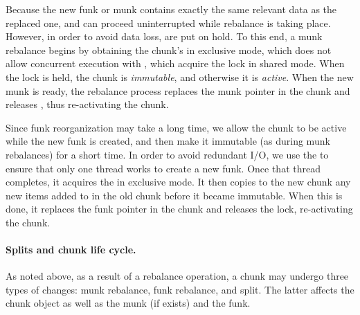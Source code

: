 Because the new funk or munk contains exactly the same relevant data as the replaced one, 
 and  can proceed uninterrupted while rebalance is taking place. 
However, in order to avoid data loss,  are put on hold. 
To this end, a munk rebalance begins by obtaining the chunk's  in exclusive mode,
which does not allow concurrent execution with  , which acquire the lock in shared mode.
When the lock is held, the chunk is \emph{immutable}, and otherwise it is \emph{active}. 
When the new munk is ready, the rebalance process replaces the munk pointer in the chunk and releases , thus 
re-activating the chunk.

Since funk reorganization may take a long time, we allow the chunk to be active while the new funk is created,
and then make it immutable (as during munk rebalances) for a short time. In order to avoid redundant I/O, 
we use the  to ensure that only one thread works to create a new funk.  Once that thread
completes, it acquires the  in exclusive mode.
It then copies to the new chunk any new items added to   in the old chunk before it became immutable. 
When this is done, it replaces the funk pointer in the chunk and releases the lock, re-activating the chunk.

\paragraph{Splits and chunk life cycle.}

As noted above, as a result of a rebalance operation, a chunk may undergo three types of changes: munk rebalance, funk rebalance, and split. 
The latter affects the chunk object as well as the munk (if exists) and the funk.

